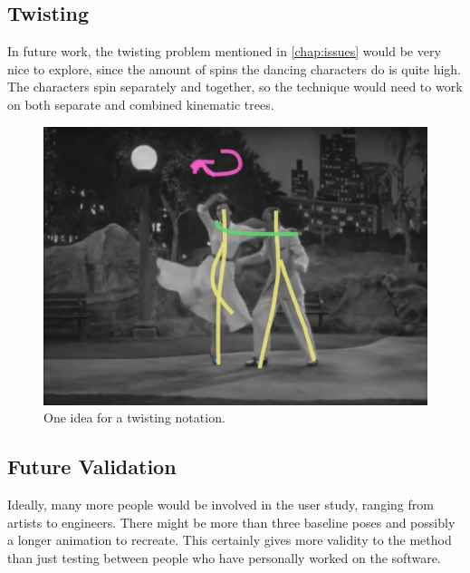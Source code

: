 \subsection{Twisting}
In future work, the twisting problem mentioned in \autoref{chap:issues} would be very nice to explore, since the amount of spins the dancing characters do is quite high. The characters spin separately and together, so the technique would need to work on both separate and combined kinematic trees.
\begin{figure}[!h]
\centering
\includegraphics[scale=0.5]{img/twistingannotation}
\caption{One idea for a twisting notation.}
\end{figure}

\subsection{Future Validation}
Ideally, many more people would be involved in the user study, ranging from artists to engineers. There might be more than three baseline poses and possibly a longer animation to recreate. This certainly gives more validity to the method than just testing between people who have personally worked on the software.